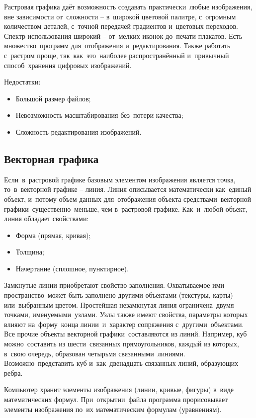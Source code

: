 \documentclass{ou}
\begin{document}
Растровая графика даёт возможность создавать практически~любые изображения, вне зависимости от~сложности -- в~широкой цветовой палитре, с~огромным количеством деталей, с~точной передачей градиентов и~цветовых переходов. Спектр использования широкий -- от~мелких иконок до~печати плакатов. Есть множество~программ для~отображения и~редактирования. Также работать с~растром проще, так~как~это~наиболее распространённый и~привычный способ~хранения цифровых изображений.

Недостатки:
\begin{itemize}[label=-, leftmargin=0em, itemindent=3.35em, nosep]
\item Большой размер файлов;
\item Невозможность масштабирования без~потери качества;
\item Сложность редактирования изображений.
\end{itemize}
\subsection{Векторная графика}
Если~в~растровой графике базовым элементом изображения является точка, то~в~векторной графике -- линия. Линия описывается математически как~единый объект, и~потому объем данных для~отображения объекта средствами~векторной графики~существенно~меньше, чем в~растровой графике. Как~и~любой объект, линия обладает свойствами:
\begin{itemize}[label=-, leftmargin=0em, itemindent=3.35em, nosep]
\item Форма (прямая, кривая);
\item Толщина;
\item Начертание (сплошное, пунктирное).
\end{itemize}

Замкнутые линии приобретают свойство заполнения. Охватываемое ими пространство~может быть заполнено другими объектами (текстуры, карты) или~выбранным цветом. Простейшая незамкнутая линия ограничена~двумя точками, именуемыми~узлами. Узлы также имеют свойства, параметры которых влияют на~форму~конца линии~и~характер сопряжения с~другими~объектами. Все прочие объекты векторной графики~составляются из линий. Например, куб можно~составить из шести~связанных прямоугольников, каждый из которых, в~свою очередь, образован четырьмя связанными~линиями. Возможно~представить куб и~как~двенадцать связанных линий, образующих ребра.

Компьютер хранит элементы изображения (линии, кривые, фигуры) в~виде математических формул. При~открытии~файла программа прорисовывает элементы изображения по~их математическим формулам (уравнениям).
\end{document}
